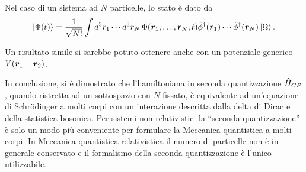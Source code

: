 Nel caso di un sistema ad $N$ particelle, lo stato è dato da
\begin{equation}
    \ket{\Phi(t)} = \frac{1}{\sqrt{N!}}\int d^3r_1\cdots d^3r_N\,\Phi(\bm{r}_1,\dots,\bm{r}_N,t)\hat{\phi}^\dagger(\bm{r}_1)\cdots\hat{\phi}^\dagger(\bm{r}_N)\ket{\Omega}.
\end{equation}
\begin{obs}
    Un risultato simile si sarebbe potuto ottenere anche con un potenziale generico $V(\bm{r}_1 - \bm{r}_2)$.
\end{obs}
In conclusione, si è dimostrato che l'hamiltoniana in seconda quantizzazione $\hat{H}_{GP}$, quando ristretta ad un sottospazio con $N$ fissato, è equivalente ad un'equazione di Schr\"odinger a molti corpi con un interazione descritta dalla delta di Dirac e della statistica bosonica. Per sistemi non relativistici la ``seconda quantizzazione'' è solo un modo più conveniente per formulare la Meccanica quantistica a molti corpi. In Meccanica quantistica relativistica il numero di particelle non è in generale conservato e il formalismo della seconda quantizzazione è l'unico utilizzabile.
\begin{center}
\end{center}

